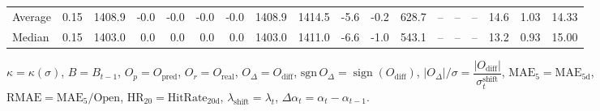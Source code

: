\begin{threeparttable}
{\begin{tabular}{lrrrrrrrrrrrrrrrrr}
Average &     0.15 & 1408.9 &              -0.0 &              -0.0 &               -0.0 &               -0.0 & 1408.9 & 1414.5 &       -5.6 &                     -0.2 &               628.7 &         -- &        -- &             -- &             14.6 &            1.03 &                  14.33 \\
 Median &     0.15 & 1403.0 &               0.0 &               0.0 &                0.0 &                0.0 & 1403.0 & 1411.0 &       -6.6 &                     -1.0 &               543.1 &         -- &        -- &             -- &             13.2 &            0.93 &                  15.00 \\
\bottomrule
\end{tabular}
}
\begin{tablenotes}\footnotesize
\item $\kappa=\kappa(\sigma)$, $B=B_{t-1}$, $O_p=O_{\text{pred}}$, $O_r=O_{\text{real}}$, $O_\Delta=O_{\text{diff}}$, $\mathrm{sgn}\,O_\Delta=\operatorname{sign}(O_{\text{diff}})$, $|O_\Delta|/\sigma=\dfrac{|O_{\text{diff}}|}{\sigma_t^{\text{shift}}}$, $\mathrm{MAE}_5=\mathrm{MAE}_{5\text{d}}$, $\mathrm{RMAE}= \mathrm{MAE}_5 / \text{Open}$, $\mathrm{HR}_{20}=\mathrm{HitRate}_{20\text{d}}$, 
$\lambda_{\text{shift}}=\lambda_t$, 
$\Delta\alpha_t=\alpha_t-\alpha_{t-1}$.
\end{tablenotes}
\end{threeparttable}
\endgroup

